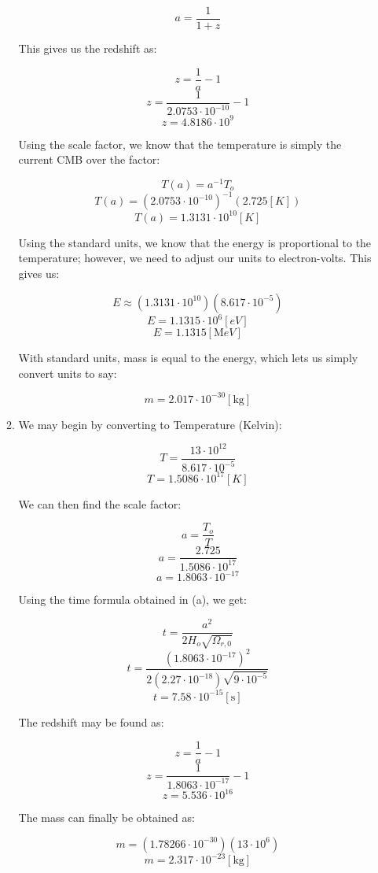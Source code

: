 \begin{enumerate}
\begin{enumerate}
        $$a=\frac{1}{1+z}$$

        This gives us the redshift as:

        $$z=\frac{1}{a}-1$$
        $$z=\frac{1}{2.0753\cdot10^{-10}}-1$$
        $$\boxed{z=4.8186\cdot10^{9}}$$

        Using the scale factor, we know that the temperature is simply the current CMB over the factor:

        $$T(a)=a^{-1}T_o$$
        $$T(a)=\left( 2.0753\cdot10^{-10} \right)^{-1}(2.725[\si{K}])$$
        $$\boxed{T(a)=1.3131\cdot10^{10}[\si{K}]}$$

        Using the standard units, we know that the energy is proportional to the temperature; however, we need to adjust our units to electron-volts. This gives us:

        $$E\approx (1.3131\cdot10^{10})(8.617\cdot10^{-5})$$
        $$E=1.1315\cdot10^6[\si{eV}]$$
        $$\boxed{E=1.1315[\si{\mega eV}]}$$

        With standard units, mass is equal to the energy, which lets us simply convert units to say:

        $$\boxed{m=2.017\cdot10^{-30}\left[\si{\kilo\gram}\right]}$$

      \item We may begin by converting to Temperature (Kelvin):

        $$T=\frac{13\cdot10^{12}}{8.617\cdot10^{-5}}$$
        $$\boxed{T=1.5086\cdot10^{17}[\si{K}]}$$

        We can then find the scale factor:

        $$a=\frac{T_o}{T}$$
        $$a=\frac{2.725}{1.5086\cdot10^{17}}$$
        $$\boxed{a=1.8063\cdot10^{-17}}$$

        Using the time formula obtained in (a), we get:

        $$t=\frac{a^2}{2H_o\sqrt{\Omega_{r,0}}}$$
        $$t=\frac{(1.8063\cdot10^{-17})^2}{2(2.27\cdot10^{-18})\sqrt{9\cdot10^{-5}}}$$
        $$\boxed{t=7.58\cdot10^{-15}[\si{\second}]}$$

        The redshift may be found as:

        $$z=\frac{1}{a}-1$$
        $$z=\frac{1}{1.8063\cdot10^{-17}}-1$$
        $$\boxed{z=5.536\cdot10^{16}}$$

        The mass can finally be obtained as:

        $$m=\left( 1.78266\cdot10^{-30} \right)\left( 13\cdot10^{6} \right)$$
        $$\boxed{m=2.317\cdot10^{-23}[\si{\kilo\gram}]}$$


\end{enumerate}
\end{enumerate}
